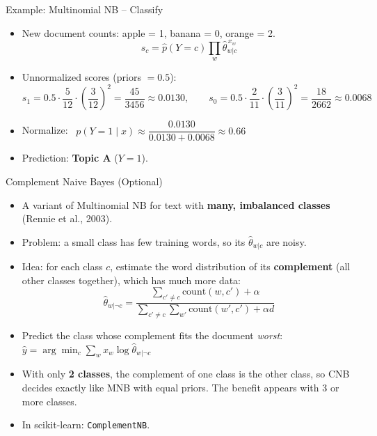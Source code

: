 \documentclass[aspectratio=169]{beamer}
\begin{document}
\begin{frame}{Example: Multinomial NB -- Classify}
\begin{itemize}
  \item New document counts: apple = 1, banana = 0, orange = 2.
  \[
    s_c = \hat p(Y=c)\prod_{w}\hat\theta_{w|c}^{\,x_w}
  \]
  \item Unnormalized scores (priors $=0.5$):
  \[
    s_1 = 0.5\cdot\frac{5}{12}\cdot\left(\frac{3}{12}\right)^2
        = \frac{45}{3456}
        \approx 0.0130,
    \qquad
    s_0 = 0.5\cdot\frac{2}{11}\cdot\left(\frac{3}{11}\right)^2
        = \frac{18}{2662}
        \approx 0.0068
  \]
  \item Normalize: \ $p(Y=1\mid x) \approx \dfrac{0.0130}{0.0130+0.0068} \approx 0.66$
  \item Prediction: \textbf{Topic A} ($Y=1$).
\end{itemize}
\end{frame}

\begin{frame}{Complement Naive Bayes (Optional)}
\begin{itemize}
  \item A variant of Multinomial NB for text with \textbf{many, imbalanced classes} (Rennie et al., 2003).
  \item Problem: a small class has few training words, so its $\hat\theta_{w|c}$ are noisy.
  \item Idea: for each class $c$, estimate the word distribution of its \textbf{complement} (all other classes together), which has much more data:
  \[
    \hat\theta_{w|\neg c}=\frac{\sum_{c'\neq c}\text{count}(w,c')+\alpha}{\sum_{c'\neq c}\sum_{w'}\text{count}(w',c')+\alpha d}
  \]
  \item Predict the class whose complement fits the document \emph{worst}: \
  $\hat y = \arg\min_c \sum_w x_w \log \hat\theta_{w|\neg c}$
  \item With only \textbf{2 classes}, the complement of one class is the other class, so CNB decides exactly like MNB with equal priors. The benefit appears with 3 or more classes.
  \item In scikit-learn: \texttt{ComplementNB}.
\end{itemize}
\end{frame}
\end{document}
